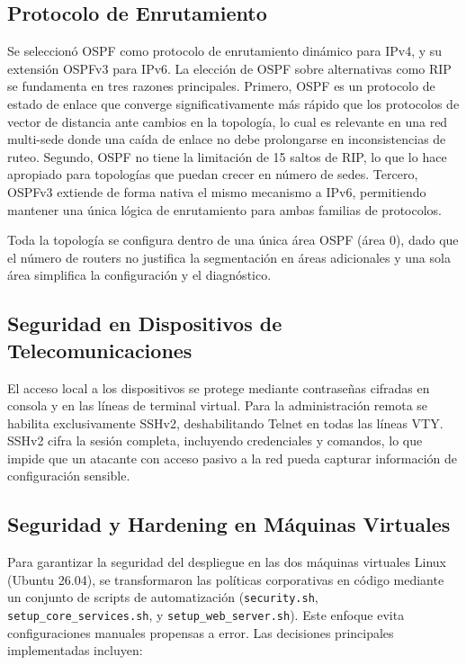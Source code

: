 \subsection{Protocolo de Enrutamiento}

Se seleccionó OSPF como protocolo de enrutamiento dinámico para IPv4, y su
extensión OSPFv3 para IPv6. La elección de OSPF sobre alternativas como RIP
se fundamenta en tres razones principales. Primero, OSPF es un protocolo de
estado de enlace que converge significativamente más rápido que los protocolos
de vector de distancia ante cambios en la topología, lo cual es relevante en
una red multi-sede donde una caída de enlace no debe prolongarse en
inconsistencias de ruteo. Segundo, OSPF no tiene la limitación de 15 saltos
de RIP, lo que lo hace apropiado para topologías que puedan crecer en número
de sedes. Tercero, OSPFv3 extiende de forma nativa el mismo mecanismo a IPv6,
permitiendo mantener una única lógica de enrutamiento para ambas familias de
protocolos.

Toda la topología se configura dentro de una única área OSPF (área 0), dado
que el número de routers no justifica la segmentación en áreas adicionales y
una sola área simplifica la configuración y el diagnóstico.

\subsection{Seguridad en Dispositivos de Telecomunicaciones}

El acceso local a los dispositivos se protege mediante contraseñas cifradas
en consola y en las líneas de terminal virtual. Para la administración remota
se habilita exclusivamente SSHv2, deshabilitando Telnet en todas las líneas
VTY. SSHv2 cifra la sesión completa, incluyendo credenciales y comandos,
lo que impide que un atacante con acceso pasivo a la red pueda capturar
información de configuración sensible.

\subsection{Seguridad y Hardening en Máquinas Virtuales}

Para garantizar la seguridad del despliegue en las dos máquinas virtuales Linux (Ubuntu 26.04), se transformaron las políticas corporativas en código mediante un conjunto de scripts de automatización (\texttt{security.sh}, \texttt{setup\_core\_services.sh}, y \texttt{setup\_web\_server.sh}). Este enfoque evita configuraciones manuales propensas a error. Las decisiones principales implementadas incluyen:

